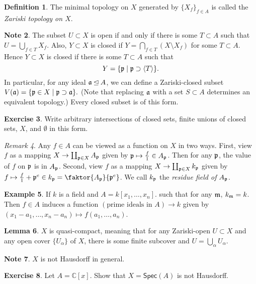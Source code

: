 \documentclass[10pt,letterpaper,cm]{nupset}
\theoremstyle{definition}
\newtheorem{definition}{Definition}[subsection]
\newtheorem{exmp}[definition]{Example}
\newtheorem{note}[definition]{Note}
\theoremstyle{theorem}
\newtheorem{lemma}[definition]{Lemma}
\newtheorem{exercise}[definition]{Exercise}
\theoremstyle{remark}
\newtheorem{remark}[definition]{Remark}
\newcommand{\C}{\mathbb C}
\newcommand{\1}{\mathbf{1}}
\newcommand{\p}{\frak{p}}
\newcommand{\0}{\vec 0}
\begin{document}
\begin{definition}
The minimal topology on $X$ generated by $\{X_f\}_{f\in A}$ is called the \textit{Zariski topology on $X$}. 
\end{definition}
\begin{note}
The subset $U\subset X$ is open if and only if there is some $T\subset A$ such that $U = \bigcup_{f\in T} X_f$. Also, $Y \subset X$ is closed if $Y = \bigcap_{f\in T} (X \setminus X_f)$ for some $T\subset A$.  Hence $Y \subset X$ is closed if there is some $T\subset A$ such that $$  Y = \{\p \mid \p \supset \langle T \rangle \}.$$ In particular,  for any ideal $\frak{a} \unlhd A$, we can define a Zariski-closed subset $V(\frak{a}) =  \{ \p \in X \mid  \p \supset \frak{a} \}.$ (Note that replacing $\frak{a}$ with a set $S\subset A$ determines an equivalent topology.) Every closed subset is of this form.
\end{note}

\begin{exercise}
Write arbitrary intersections of closed sets, finite unions of closed sets, $X$, and $\emptyset$ in this form.
\end{exercise}

\begin{remark}
Any $f\in A$ can be viewed as a function on $X$ in two ways. First, view $f$ as a mapping $X \to \coprod_{\p \in X} A_{\p}$ given by $\p \mapsto \frac{f}{1} \in A_{\p}$.  Then for any $\p$, the value of $f$ on $\p$ is in $A_{\p}$. Second, view $f$ as a mapping $X \to \coprod_{\p \in X} k_{\p}$ given by $ f \mapsto \frac{f}{1} + \p^e \in k_{\p} = \faktor{A_{\p}}{\p^e}$. We call $k_{\p}$ the \textit{residue field of $A_{\p}$}. 
\end{remark}

\begin{exmp}
If $k$ is a field and $A = k[x_1, \ldots, x_n]$. such that for any $\frak{m}$, $k_{\frak{m}} = k$. Then  $f\in A$ induces a function $(\text{prime ideals in } A) \to k$ given by $(x_1 -a_1, \ldots, x_n -a_n) \mapsto f(a_1, \ldots, a_n)$.
\end{exmp}

\begin{lemma}
$X$ is quasi-compact, meaning that for any Zariski-open $U \subset X$ and any open cover $\{U_{\alpha}\}$ of $X$, there is some finite subcover and $U = \bigcup_{\alpha} U_{\alpha}$. 
\end{lemma}

\begin{note}
$X$ is not Hausdorff in general. 
\end{note}
\begin{exercise}
Let $A= \C[x]$. Show that $X = \mathsf{Spec}(A)$ is not Hausdorff. 
\end{exercise}
\end{document}
